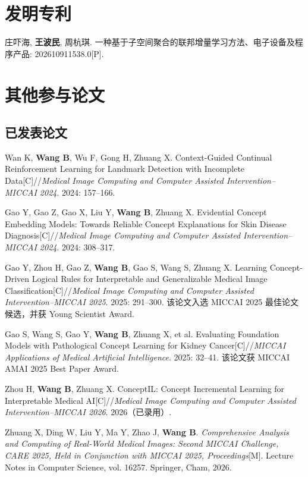 \section{发明专利}

\begin{enumerate}[
  leftmargin=2.3em,
  label={[\arabic*]},
  itemsep=0.55em,
  topsep=0.4em
]
  \item 庄吓海, \textbf{王波民}, 周杭琪.
  一种基于子空间聚合的联邦增量学习方法、电子设备及程序产品:
  202610911538.0[P].
\end{enumerate}


\section{其他参与论文}

\subsection*{已发表论文}
\begin{enumerate}[leftmargin=2.3em,label={[\arabic*]},itemsep=0.55em,topsep=0.4em]
  \item Wan K, \textbf{Wang B}, Wu F, Gong H, Zhuang X. Context-Guided Continual Reinforcement Learning for Landmark Detection with Incomplete Data[C]//\emph{Medical Image Computing and Computer Assisted Intervention--MICCAI 2024}. 2024: 157--166.

  \item Gao Y, Gao Z, Gao X, Liu Y, \textbf{Wang B}, Zhuang X. Evidential Concept Embedding Models: Towards Reliable Concept Explanations for Skin Disease Diagnosis[C]//\emph{Medical Image Computing and Computer Assisted Intervention--MICCAI 2024}. 2024: 308--317.

  \item Gao Y, Zhou H, Gao Z, \textbf{Wang B}, Gao S, Wang S, Zhuang X. Learning Concept-Driven Logical Rules for Interpretable and Generalizable Medical Image Classification[C]//\emph{Medical Image Computing and Computer Assisted Intervention--MICCAI 2025}. 2025: 291--300. 该论文入选 MICCAI 2025 最佳论文候选，并获 Young Scientist Award.

  \item Gao S, Wang S, Gao Y, \textbf{Wang B}, Zhuang X, et al. Evaluating Foundation Models with Pathological Concept Learning for Kidney Cancer[C]//\emph{MICCAI Applications of Medical Artificial Intelligence}. 2025: 32--41. 该论文获 MICCAI AMAI 2025 Best Paper Award.

  \item Zhou H, \textbf{Wang B}, Zhuang X. ConceptIL: Concept Incremental Learning for Interpretable Medical AI[C]//\emph{Medical Image Computing and Computer Assisted Intervention--MICCAI 2026}. 2026（已录用）.

  \item Zhuang X, Ding W, Liu Y, Ma Y, Zhao J, \textbf{Wang B}. \emph{Comprehensive Analysis and Computing of Real-World Medical Images: Second MICCAI Challenge, CARE 2025, Held in Conjunction with MICCAI 2025, Proceedings}[M]. Lecture Notes in Computer Science, vol. 16257. Springer, Cham, 2026.
\end{enumerate}

